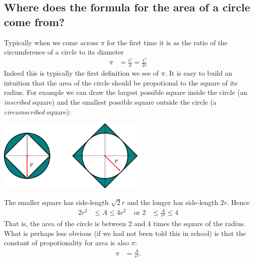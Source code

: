 \subsection{Where does the formula for the area of a circle come from?}
Typically when we come across $\pi$ for the first time it is as the ratio of the
circumference of a circle to its diameter
\begin{align*}
  \pi &= \frac{C}{d} = \frac{C}{2r}
\end{align*}
Indeed this is typically the first definition we see of $\pi$.  It is easy to build an intuition that the area of the circle should be propotional to the square of its radius. For example we can draw the largest possible square inside the circle (an \emph{inscribed} square) and the smallest possible square outside the circle (a \emph{circumscribed} square):
\begin{center}
 \includegraphics[height=35mm]{archimedes0}
\end{center}
The smaller square has side-length $\sqrt{2} r$ and the longer has side-length $2r$. Hence
\begin{align*}
  2 r^2 & \leq A \leq 4r^2 & \text{ or }  2 & \leq \frac{A}{r^2} \leq 4
\end{align*}
That is, the area of the circle is between 2 and 4 times the square of the radius. What is perhaps less obvious (if we had not been told this in school) is that the constant of propotionality for area is also $\pi$:
\begin{align*}
  \pi &= \frac{A}{r^2}.
\end{align*}


